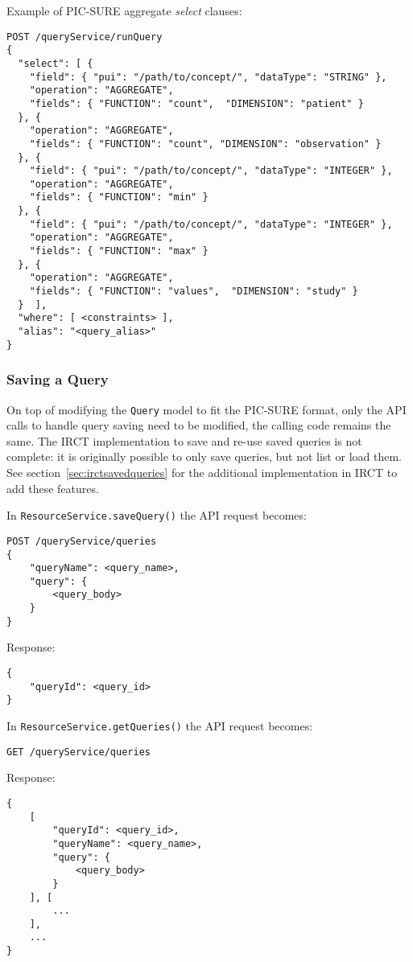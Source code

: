 Example of PIC-SURE aggregate \emph{select} clauses:
\begin{verbatim}
POST /queryService/runQuery
{
  "select": [ {
    "field": { "pui": "/path/to/concept/", "dataType": "STRING" },
    "operation": "AGGREGATE",
    "fields": { "FUNCTION": "count",  "DIMENSION": "patient" }
  }, {
    "operation": "AGGREGATE",
    "fields": { "FUNCTION": "count", "DIMENSION": "observation" }
  }, {
    "field": { "pui": "/path/to/concept/", "dataType": "INTEGER" },
    "operation": "AGGREGATE",
    "fields": { "FUNCTION": "min" }
  }, {
    "field": { "pui": "/path/to/concept/", "dataType": "INTEGER" },
    "operation": "AGGREGATE",
    "fields": { "FUNCTION": "max" }
  }, {
    "operation": "AGGREGATE",
    "fields": { "FUNCTION": "values",  "DIMENSION": "study" }
  }  ],
  "where": [ <constraints> ],
  "alias": "<query_alias>"
}
\end{verbatim}


\subsubsection{Saving a Query}
On top of modifying the \verb|Query| model to fit the PIC-SURE format, only the API calls to handle query saving need to be modified, the calling code remains the same.
The IRCT implementation to save and re-use saved queries is not complete: it is originally possible to only save queries, but not list or load them. 
See section~\ref{sec:irctsavedqueries} for the additional implementation in IRCT to add these features.

In \verb|ResourceService.saveQuery()| the API request becomes:
\begin{verbatim}
POST /queryService/queries
{
    "queryName": <query_name>,
    "query": {
        <query_body>
    }
}    
\end{verbatim}

Response:
\begin{verbatim}
{
    "queryId": <query_id>
}    
\end{verbatim}

In  \verb|ResourceService.getQueries()| the API request becomes:
\begin{verbatim}
GET /queryService/queries
\end{verbatim}

Response:
\begin{verbatim}
{
    [
        "queryId": <query_id>,
        "queryName": <query_name>,
        "query": {
            <query_body>
        }
    ], [
        ...
    ],
    ...
}    
\end{verbatim}

